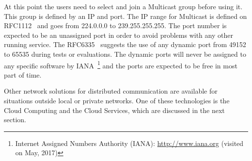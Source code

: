 At this point the users need to select and join a Multicast group before using it.
This group is defined by an IP and port.
The IP range for Multicast is defined on RFC1112~\citep{RFC1112Multicasting} and goes from 224.0.0.0 to 239.255.255.255.
The port number is expected to be an unassigned port in order to avoid problems with any other running service.
The RFC6335~\citep{RFC6335IANA} suggests the use of any dynamic port from 49152 to 65535 during tests or evaluations.
The dynamic ports will never be assigned to any specific software by IANA~\footnote{Internet Assigned Numbers Authority (IANA): \url{http://www.iana.org} (visited on May, 2017)} and the ports are expected to be free in most part of time.

Other network solutions for distributed communication are available for situations outside local or private networks.
One of these technologies is the Cloud Computing and the Cloud Services, which are discussed in the next section.
























